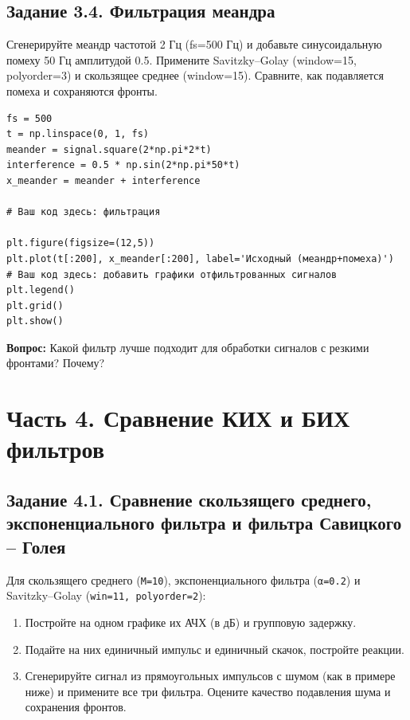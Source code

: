 \documentclass[12pt,a4paper,openany]{book}
\providecommand{\tightlist}{\setlength{\itemsep}{0pt}\setlength{\parskip}{0pt}}
\begin{document}
\subsection*{Задание 3.4. Фильтрация меандра}

Сгенерируйте меандр частотой 2 Гц (fs=500 Гц) и добавьте синусоидальную помеху 50 Гц амплитудой 0.5. Примените Savitzky--Golay (window=15, polyorder=3) и скользящее среднее (window=15). Сравните, как подавляется помеха и сохраняются фронты.

\begin{Verbatim}[fontsize=\small, breaklines, breakanywhere, frame=single, framesep=2mm]
fs = 500
t = np.linspace(0, 1, fs)
meander = signal.square(2*np.pi*2*t)
interference = 0.5 * np.sin(2*np.pi*50*t)
x_meander = meander + interference

# Ваш код здесь: фильтрация

plt.figure(figsize=(12,5))
plt.plot(t[:200], x_meander[:200], label='Исходный (меандр+помеха)')
# Ваш код здесь: добавить графики отфильтрованных сигналов
plt.legend()
plt.grid()
plt.show()
\end{Verbatim}

\textbf{Вопрос:} Какой фильтр лучше подходит для обработки сигналов с резкими фронтами? Почему?

\section*{Часть 4. Сравнение КИХ и БИХ фильтров}

\subsection*{Задание 4.1. Сравнение скользящего среднего, экспоненциального фильтра и фильтра Савицкого -- Голея}

Для скользящего среднего (\texttt{M=\allowbreak{}10}), экспоненциального фильтра (\texttt{α=\allowbreak{}0.\allowbreak{}2}) и Savitzky--Golay (\texttt{win=\allowbreak{}11,\allowbreak{}\ polyorder=\allowbreak{}2}):

\begin{enumerate}
\def\labelenumi{\arabic{enumi}.}
\tightlist
\item
  Постройте на одном графике их АЧХ (в дБ) и групповую задержку.
\item
  Подайте на них единичный импульс и единичный скачок, постройте реакции.
\item
  Сгенерируйте сигнал из прямоугольных импульсов с шумом (как в примере ниже) и примените все три фильтра. Оцените качество подавления шума и сохранения фронтов.
\end{enumerate}
\end{document}
